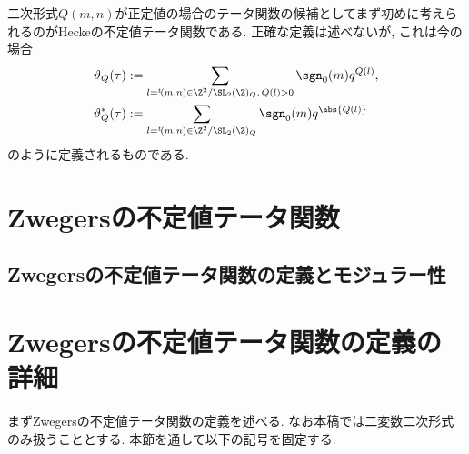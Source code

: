\documentclass[11pt,b5paper,oneside,lualatex]{ltjsarticle} %
\numberwithin{equation}{section} %
\begin{document}
二次形式$ Q(m, n) $が正定値の場合のテータ関数の候補としてまず初めに考えられるのがHeckeの不定値テータ関数である. 
正確な定義は述べないが, これは今の場合
\begin{align}
	\vartheta_Q (\tau) 
	&:=
	\sum_{l = {}^t\!(m, n) \in \Z^2 / \SL_2(\Z)_Q, \, Q(l) > 0} \sgn_0(m) q^{Q(l)}, 
	\\
	\vartheta_Q^* (\tau)
	&:=
	\sum_{l = {}^t\!(m, n) \in \Z^2 / \SL_2(\Z)_Q} \sgn_0(m) q^{\abs{Q(l)}}
\end{align}
のように定義されるものである. 


















\section{Zwegersの不定値テータ関数} \label{sec:Zwegers_theta}





\subsection{Zwegersの不定値テータ関数の定義とモジュラー性} \label{subsec:Zwegers_theta_def}




\section{Zwegersの不定値テータ関数の定義の詳細} \label{sec:dfn}


まずZwegersの不定値テータ関数の定義を述べる. 
なお本稿では二変数二次形式のみ扱うこととする. 
本節を通して以下の記号を固定する. 
\end{document}
